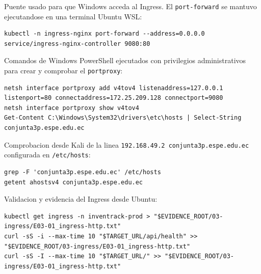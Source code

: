 Puente usado para que Windows acceda al Ingress. El \texttt{port-forward} se mantuvo ejecutandose en una terminal Ubuntu WSL:

\begin{tcolorbox}[codebox]
\begin{Verbatim}[fontsize=\scriptsize,breaklines=true,breakanywhere=true]
kubectl -n ingress-nginx port-forward --address=0.0.0.0 service/ingress-nginx-controller 9080:80
\end{Verbatim}
\end{tcolorbox}

Comandos de Windows PowerShell ejecutados con privilegios administrativos para crear y comprobar el \texttt{portproxy}:

\begin{tcolorbox}[codebox]
\begin{Verbatim}[fontsize=\scriptsize,breaklines=true,breakanywhere=true]
netsh interface portproxy add v4tov4 listenaddress=127.0.0.1 listenport=80 connectaddress=172.25.209.128 connectport=9080
netsh interface portproxy show v4tov4
Get-Content C:\Windows\System32\drivers\etc\hosts | Select-String conjunta3p.espe.edu.ec
\end{Verbatim}
\end{tcolorbox}

Comprobacion desde Kali de la linea \texttt{192.168.49.2\ conjunta3p.espe.edu.ec} configurada en \texttt{/etc/hosts}:

\begin{tcolorbox}[codebox]
\begin{Verbatim}[fontsize=\scriptsize,breaklines=true,breakanywhere=true]
grep -F 'conjunta3p.espe.edu.ec' /etc/hosts
getent ahostsv4 conjunta3p.espe.edu.ec
\end{Verbatim}
\end{tcolorbox}

Validacion y evidencia del Ingress desde Ubuntu:

\begin{tcolorbox}[codebox]
\begin{Verbatim}[fontsize=\scriptsize,breaklines=true,breakanywhere=true]
kubectl get ingress -n inventrack-prod > "$EVIDENCE_ROOT/03-ingress/E03-01_ingress-http.txt"
curl -sS -i --max-time 10 "$TARGET_URL/api/health" >> "$EVIDENCE_ROOT/03-ingress/E03-01_ingress-http.txt"
curl -sS -I --max-time 10 "$TARGET_URL/" >> "$EVIDENCE_ROOT/03-ingress/E03-01_ingress-http.txt"
\end{Verbatim}
\end{tcolorbox}

